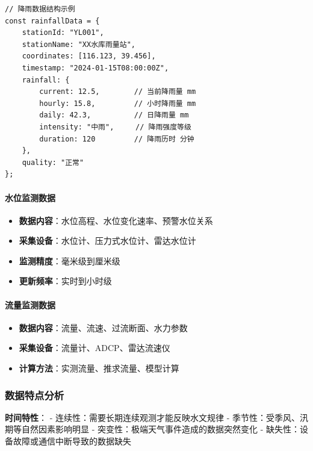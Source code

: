\begin{lstlisting}
// 降雨数据结构示例
const rainfallData = {
    stationId: "YL001",
    stationName: "XX水库雨量站",
    coordinates: [116.123, 39.456],
    timestamp: "2024-01-15T08:00:00Z",
    rainfall: {
        current: 12.5,        // 当前降雨量 mm
        hourly: 15.8,         // 小时降雨量 mm
        daily: 42.3,          // 日降雨量 mm
        intensity: "中雨",     // 降雨强度等级
        duration: 120         // 降雨历时 分钟
    },
    quality: "正常"
};
\end{lstlisting}

\paragraph{水位监测数据}\label{ux6c34ux4f4dux76d1ux6d4bux6570ux636e}

\begin{itemize}
\tightlist
\item
  \textbf{数据内容}：水位高程、水位变化速率、预警水位关系
\item
  \textbf{采集设备}：水位计、压力式水位计、雷达水位计
\item
  \textbf{监测精度}：毫米级到厘米级
\item
  \textbf{更新频率}：实时到小时级
\end{itemize}

\paragraph{流量监测数据}\label{ux6d41ux91cfux76d1ux6d4bux6570ux636e}

\begin{itemize}
\tightlist
\item
  \textbf{数据内容}：流量、流速、过流断面、水力参数
\item
  \textbf{采集设备}：流量计、ADCP、雷达流速仪
\item
  \textbf{计算方法}：实测流量、推求流量、模型计算
\end{itemize}

\subsubsection{数据特点分析}\label{ux6570ux636eux7279ux70b9ux5206ux6790}

\textbf{时间特性}： - 连续性：需要长期连续观测才能反映水文规律 -
季节性：受季风、汛期等自然因素影响明显 -
突变性：极端天气事件造成的数据突然变化 -
缺失性：设备故障或通信中断导致的数据缺失

